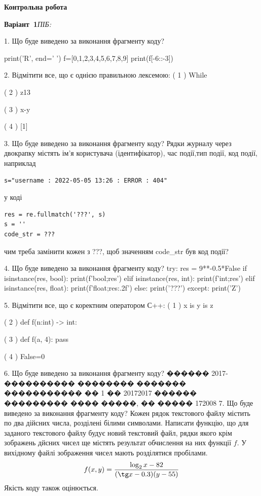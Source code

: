 \documentclass[11pt]{article}
\begin{document}
{\large\textbf{Контрольна робота}}

\textbf{Варіант \No\,1}\hfill \textit{ПІБ:}\,\underline{\hspace{60mm}}
\vspace{4mm}

1. Що буде виведено за виконання фрагменту коду?

print('R', end=' ')
f=[0,1,2,3,4,5,6,7,8,9]
print(f[-6::-3])


2. Відмітити все, що є однією правильною лексемою:
( 1 ) While

( 2 ) z13

( 3 ) x-y

( 4 ) [1]

3. Що буде виведено за виконання фрагменту коду?
Рядки журналу через двокрапку містять ім'я користувача (ідентифікатор), час події,тип події, код події, наприклад
\begin{verbatim}
s="username : 2022-05-05 13:26 : ERROR : 404"
\end{verbatim}
у коді 
\begin{verbatim}
res = re.fullmatch('???', s) 
s = ''
code_str = ??? 
\end{verbatim}
чим треба замінити кожен з ???, щоб значенням code\_str був код події? 



4. Що буде виведено за виконання фрагменту коду?
try:
    res = 9**-0.5*False
    if isinstance(res, bool):
        print(f'bool;{res}')
    elif isinstance(res, int):
        print(f'int;{res}')
    elif isinstance(res, float):
        print(f'float;{res:.2f}')
    else:
        print('???')
except:
    print('Z')

5. Відмітити все, що є коректним оператором С++:
( 1 ) x is y is z

( 2 ) def f(n:int) -> int:

( 3 ) def f(a, 4): pass

( 4 ) False=0

6. Що буде виведено за виконання фрагменту коду?
������ 2017-���������� �������� ������� ����������� �� 1 �� 20172017 ������ ��������� ���� �����, �� ����� 172008
7. Що буде виведено за виконання фрагменту коду?
Кожен рядок текстового файлу містить по два дійсних числа, розділені білими символами.
Написати функцію, що для заданого текстового файлу будує новий текстовий файл, рядки якого крім зображень дйсних чисел ще містять результат обчислення на них функції $f$. У вихідному файлі зображення чисел мають розділятися пробілами. 
$$f(x, y) =\frac{\log_{2} x - 82}{(\tg x - 0.3) (y - 55)}$$ 
Якість коду також оцінюється.
\end{document}
